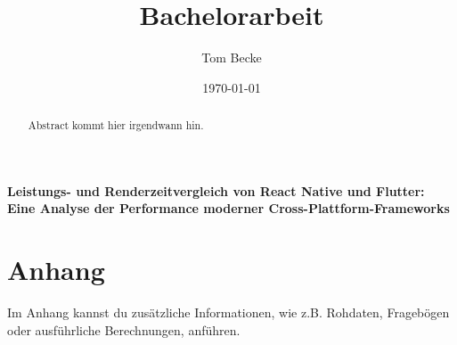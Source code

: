 \documentclass[a4paper,12pt]{article}
\title{Bachelorarbeit}
\author{Tom Becke}
\date{\today}
\begin{document}
\doublespacing

\maketitle

\begin{center}
    {\LARGE \textbf{Leistungs- und Renderzeitvergleich von React Native und Flutter: Eine Analyse der Performance moderner Cross-Plattform-Frameworks}}
\end{center}

\begin{abstract}
    Abstract kommt hier irgendwann hin.
\end{abstract}

\newpage

\tableofcontents

\newpage



















\newpage

\printbibliography

\appendix
\section{Anhang}
Im Anhang kannst du zusätzliche Informationen, wie z.B. Rohdaten, Fragebögen oder ausführliche Berechnungen, anführen.
\end{document}
